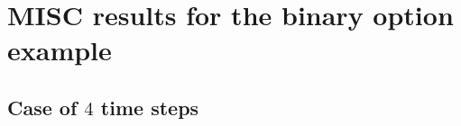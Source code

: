 \documentclass[11pt]{article}
\begin{document}
\section{MISC results for the binary option example}\label{app:MISC binary option}
\subsection{Case of $4$ time steps}


\end{document}
